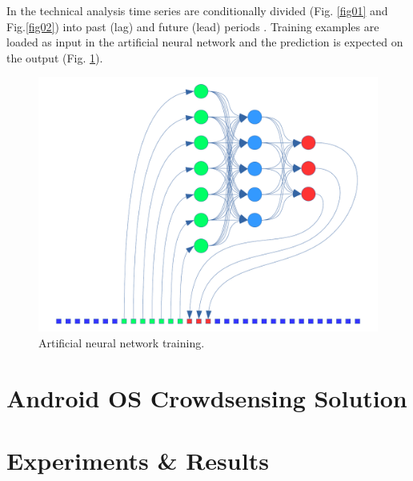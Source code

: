 \documentclass[runningheads]{llncs}
\begin{document}
In the technical analysis time series are conditionally divided (Fig. \ref{fig01} and Fig.\ref{fig02}) into past (lag) and future (lead) periods \cite{time-series-04}. Training examples are loaded as input in the artificial neural network \cite{time-series-04} and the prediction is expected on the output (Fig. \ref{fig03}).

\begin{figure}
\includegraphics[width=\textwidth]{fig03.png}
\caption{Artificial neural network training.}
\label{fig03}
\end{figure}
%
\section{Android OS Crowdsensing Solution}
%
\section{Experiments \& Results}
%
\end{document}
